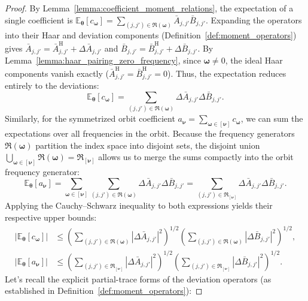 \documentclass[%
 reprint,
 amsmath,amssymb,
 aps,
 pra,
]{revtex4-2}
\theoremstyle{definition}
\begin{document}
\begin{proof}
By Lemma~\ref{lemma:coefficient_moment_relations}, the expectation of a single coefficient is $\mathbb{E}_{\bm{\theta}} [ c_{\bm{\omega}} ] = \sum_{(j,j')\in\mathfrak R(\bm{\omega})} \bar A_{j,j'}\bar B_{j,j'}$. Expanding the operators into their Haar and deviation components (Definition~\ref{def:moment_operators}) gives $\bar A_{j,j'} = \bar A^{\mathrm H}_{j,j'} + \Delta\bar A_{j,j'}$ and $\bar B_{j,j'} = \bar B^{\mathrm H}_{j,j'} + \Delta\bar B_{j,j'}$. By Lemma~\ref{lemma:haar_pairing_zero_frequency}, since $\bm{\omega}\neq0$, the ideal Haar components vanish exactly ($\bar A^{\mathrm H}_{j,j'} = \bar B^{\mathrm H}_{j,j'} = 0$). Thus, the expectation reduces entirely to the deviations:
\begin{equation}
\mathbb{E}_{\bm{\theta}} [ c_{\bm{\omega}} ]
=
\sum_{(j,j')\in\mathfrak R(\bm{\omega})} \Delta\bar A_{j,j'} \Delta\bar B_{j,j'}.
\end{equation}
Similarly, for the symmetrized orbit coefficient $a_{\bm{\nu}} = \sum_{\bm{\omega}\in[\bm{\nu}]} c_{\bm{\omega}}$, we can sum the expectations over all frequencies in the orbit. Because the frequency generators $\mathfrak{R}(\bm{\omega})$ partition the index space into disjoint sets, the disjoint union $\bigcup_{\bm{\omega}\in[\bm{\nu}]} \mathfrak{R}(\bm{\omega}) = \mathfrak{R}_{[\bm{\nu}]}$ allows us to merge the sums compactly into the orbit frequency generator:
\begin{equation}
\mathbb{E}_{\bm{\theta}} [ a_{\bm{\nu}} ]
=
\sum_{\bm{\omega}\in[\bm{\nu}]} \sum_{(j,j')\in\mathfrak R(\bm{\omega})} \Delta\bar A_{j,j'} \Delta\bar B_{j,j'}
=
\sum_{(j,j')\in\mathfrak R_{[\bm{\nu}]}} \Delta\bar A_{j,j'} \Delta\bar B_{j,j'}.
\end{equation}
Applying the Cauchy--Schwarz inequality to both expressions yields their respective upper bounds:
\begin{align}
\left| \mathbb{E}_{\bm{\theta}} [ c_{\bm{\omega}} ] \right|
&\leq
\left( \sum_{(j,j')\in\mathfrak R(\bm{\omega})} |\Delta\bar A_{j,j'}|^2 \right)^{1/2}
\left( \sum_{(j,j')\in\mathfrak R(\bm{\omega})} |\Delta\bar B_{j,j'}|^2 \right)^{1/2}, \label{eq:cs_bound_single}\\
\left| \mathbb{E}_{\bm{\theta}} [ a_{\bm{\nu}} ] \right|
&\leq
\left( \sum_{(j,j')\in\mathfrak R_{[\bm{\nu}]}} |\Delta\bar A_{j,j'}|^2 \right)^{1/2}
\left( \sum_{(j,j')\in\mathfrak R_{[\bm{\nu}]}} |\Delta\bar B_{j,j'}|^2 \right)^{1/2}. \label{eq:cs_bound_orbit}
\end{align}
Let's recall the explicit partial-trace forms of the deviation operators (as established in Definition~\ref{def:moment_operators}):

\end{proof}
\end{document}
